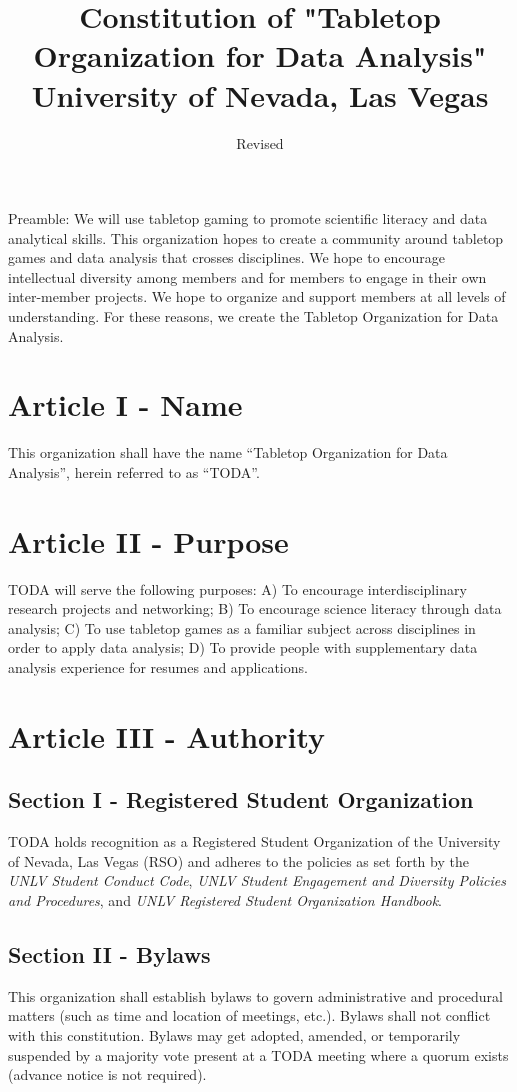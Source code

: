 \documentclass[11pt]{article}
\date{Revised}
\title{Constitution of "Tabletop Organization for Data Analysis"\\\medskip
\large University of Nevada, Las Vegas}
\begin{document}
\maketitle
\tableofcontents

Preamble: We will use tabletop gaming to promote scientific literacy and data analytical skills. 
This organization hopes to create a community around tabletop games and data analysis that crosses disciplines. 
We hope to encourage intellectual diversity among members and for members to engage in their own inter-member projects. 
We hope to organize and support members at all levels of understanding. 
For these reasons, we create the Tabletop Organization for Data Analysis.

\section{Article I - Name}
\label{sec:org8e85648}

This organization shall have the name “Tabletop Organization for Data Analysis”, herein referred to as “TODA”.

\section{Article II - Purpose}
\label{sec:orgea8df1c}

TODA will serve the following purposes:
  A) To encourage interdisciplinary research projects and networking;
  B) To encourage science literacy through data analysis;
  C) To use tabletop games as a familiar subject across disciplines in order to apply data analysis;
  D) To provide people with supplementary data analysis experience for resumes and applications.

\section{Article III - Authority}
\label{sec:org71754f6}
\subsection{Section I - Registered Student Organization}
\label{sec:orge5011ec}
TODA holds recognition as a Registered Student Organization of the University of Nevada, Las Vegas (RSO) and adheres to the policies as set forth by the \emph{UNLV Student Conduct Code}, \emph{UNLV Student Engagement and Diversity Policies and Procedures}, and \emph{UNLV Registered Student Organization Handbook}.
\subsection{Section II - Bylaws}
\label{sec:orgf884c99}
This organization shall establish bylaws to govern administrative and procedural matters (such as time and location of meetings, etc.). 
Bylaws shall not conflict with this constitution. 
Bylaws may get adopted, amended, or temporarily suspended by a majority vote present at a TODA meeting where a quorum exists (advance notice is not required).
\end{document}
